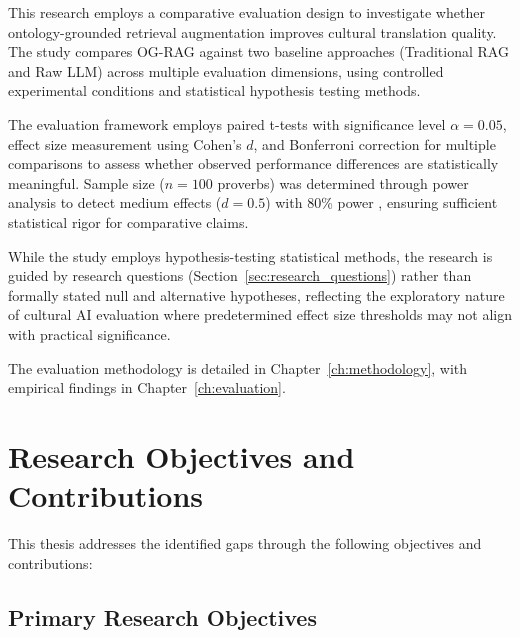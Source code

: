 This research employs a comparative evaluation design to investigate whether ontology-grounded retrieval augmentation improves cultural translation quality. The study compares OG-RAG against two baseline approaches (Traditional RAG and Raw LLM) across multiple evaluation dimensions, using controlled experimental conditions and statistical hypothesis testing methods.

The evaluation framework employs paired t-tests with significance level $\alpha = 0.05$, effect size measurement using Cohen's $d$, and Bonferroni correction for multiple comparisons to assess whether observed performance differences are statistically meaningful. Sample size ($n = 100$ proverbs) was determined through power analysis to detect medium effects ($d = 0.5$) with 80\% power \cite{lakens2013calculating}, ensuring sufficient statistical rigor for comparative claims.

While the study employs hypothesis-testing statistical methods, the research is guided by research questions (Section~\ref{sec:research_questions}) rather than formally stated null and alternative hypotheses, reflecting the exploratory nature of cultural AI evaluation where predetermined effect size thresholds may not align with practical significance.

The evaluation methodology is detailed in Chapter~\ref{ch:methodology}, with empirical findings in Chapter~\ref{ch:evaluation}.

\section{Research Objectives and Contributions}
\label{sec:objectives}

This thesis addresses the identified gaps through the following objectives and contributions:

\subsection{Primary Research Objectives}
\label{subsec:objectives_primary}

